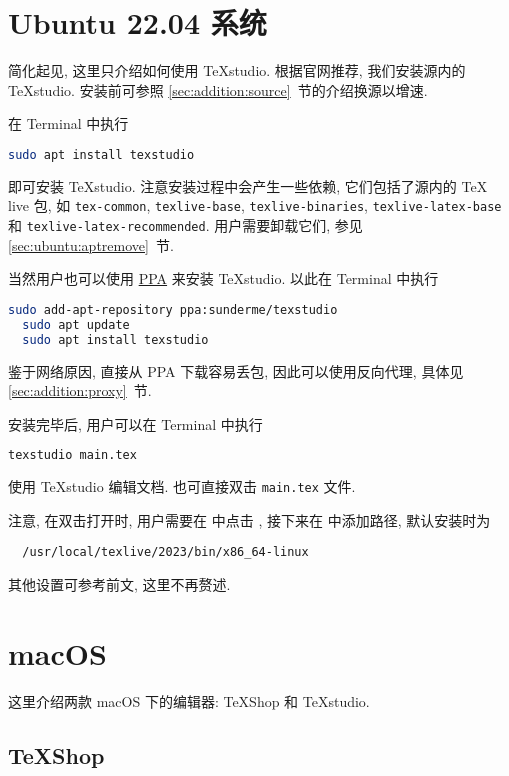 \section{Ubuntu 22.04 系统}\label{sec:editor:ubuntu}

简化起见, 这里只介绍如何使用 \TeX studio.
根据官网推荐, 我们安装源内的 \TeX studio.
安装前可参照 \ref{sec:addition:source}~节的介绍换源以增速.

在 \textsf{Terminal} 中执行
\begin{lstlisting}[language = bash]
  sudo apt install texstudio
\end{lstlisting}
即可安装 \TeX studio.
注意安装过程中会产生一些依赖, 它们包括了源内的 \TeX{} live 包, 如 \texttt{tex-common}, \texttt{texlive-base}, \texttt{texlive-binaries}, \texttt{texlive-latex-base} 和 \texttt{texlive-latex-recommended}.
用户需要卸载它们,
参见 \ref{sec:ubuntu:aptremove}~节.

当然用户也可以使用
\href{https://code.launchpad.net/~sunderme/+archive/ubuntu/texstudio}{PPA}
来安装 \TeX studio.
以此在 \textsf{Terminal} 中执行
\begin{lstlisting}[language = bash]
  sudo add-apt-repository ppa:sunderme/texstudio
  sudo apt update
  sudo apt install texstudio
\end{lstlisting}
鉴于网络原因,
直接从 PPA 下载容易丢包,
因此可以使用反向代理,
具体见 \ref{sec:addition:proxy}~节.

安装完毕后,
用户可以在 \textsf{Terminal} 中执行
\begin{lstlisting}[language = bash]
  texstudio main.tex
\end{lstlisting}
使用 \TeX studio 编辑文档.
也可直接双击 \texttt{main.tex} 文件.

注意, 在双击打开时, 用户需要在
 中点击
,
接下来在 
中添加路径,
默认安装时为
\begin{lstlisting}
  /usr/local/texlive/2023/bin/x86_64-linux
\end{lstlisting}

其他设置可参考前文, 这里不再赘述.

\section{macOS}

这里介绍两款 macOS 下的编辑器:
\TeX Shop 和 \TeX studio.

\subsection{\TeX Shop}

